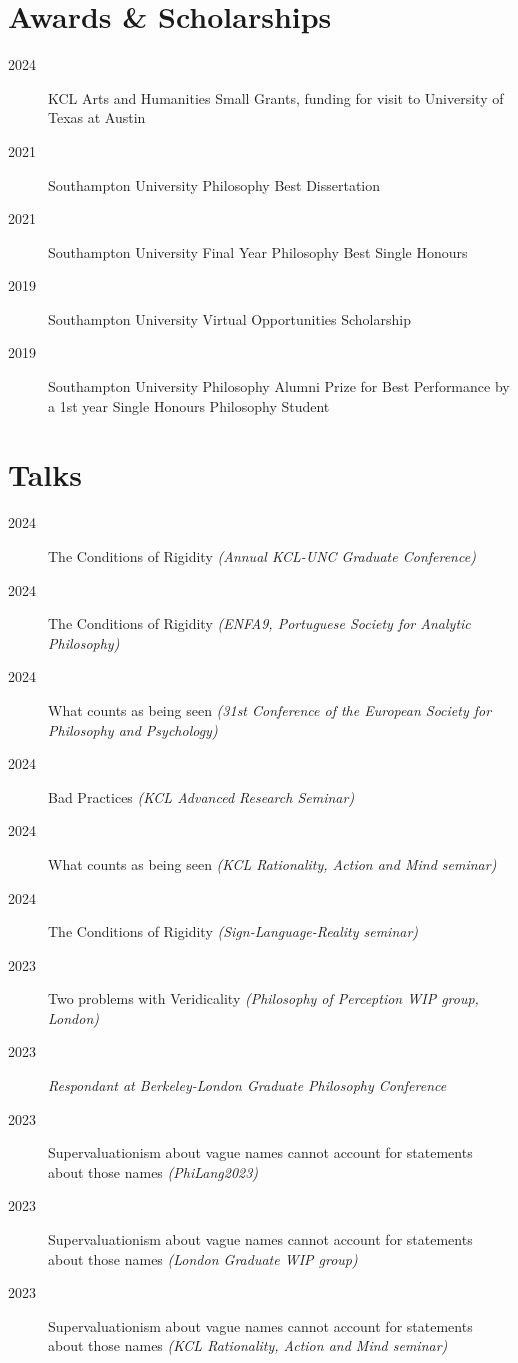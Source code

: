 \documentclass{cv}
\begin{document}
\section*{Awards \& Scholarships}
\label{sec:orgd66f836}
\begin{description}
\item[{2024}] KCL Arts and Humanities Small Grants, funding for visit to
University of Texas at Austin
\item[{2021}] Southampton University Philosophy Best Dissertation
\item[{2021}] Southampton University Final Year Philosophy Best Single
Honours
\item[{2019}] Southampton University Virtual Opportunities Scholarship
\item[{2019}] Southampton University Philosophy Alumni Prize for Best
Performance by a 1st year Single Honours Philosophy Student
\end{description}

\section*{Talks}
\label{sec:org2c71130}
\begin{description}
\item[{2024}] The Conditions of Rigidity \emph{(Annual KCL-UNC Graduate
Conference)}
\item[{2024}] The Conditions of Rigidity \emph{(ENFA9, Portuguese Society for
Analytic Philosophy)}
\item[{2024}] What counts as being seen \emph{(31st Conference of the European
Society for Philosophy and Psychology)}
\item[{2024}] Bad Practices \emph{(KCL Advanced Research Seminar)}
\item[{2024}] What counts as being seen \emph{(KCL Rationality, Action and Mind
seminar)}
\item[{2024}] The Conditions of Rigidity \emph{(Sign-Language-Reality seminar)}
\item[{2023}] Two problems with Veridicality \emph{(Philosophy of Perception
WIP group, London)}
\item[{2023}] \emph{Respondant at Berkeley-London Graduate Philosophy Conference}
\item[{2023}] Supervaluationism about vague names cannot account for
statements about those names \emph{(PhiLang2023)}
\item[{2023}] Supervaluationism about vague names cannot account for
statements about those names \emph{(London Graduate WIP group)}
\item[{2023}] Supervaluationism about vague names cannot account for
statements about those names \emph{(KCL Rationality, Action and Mind
seminar)}
\end{description}
\end{document}
